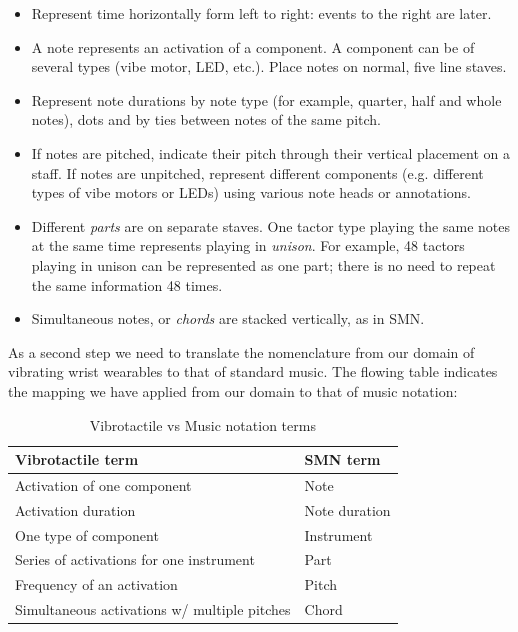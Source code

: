 \documentclass[a4paper, twocolumn]{article}
\begin{document}
\begin{itemize}
\item Represent time horizontally form left to right: events to the right are later.
\item A note represents an activation of a component. A component can be of several types (vibe motor, LED, etc.). Place notes on normal, five line staves.
\item Represent note durations by note type (for example, quarter, half and whole notes), dots and by ties between notes of the same pitch.
\item If notes are pitched, indicate their pitch through their vertical placement on a staff. If notes are unpitched, represent different components (e.g. different types of vibe motors or LEDs) using various note heads or annotations.
\item Different \textit{parts} are on separate staves. One tactor type playing the same notes at the same time represents playing in \textit{unison}. For example, 48 tactors playing in unison can be represented as one part; there is no need to repeat the same information 48 times. 
\item Simultaneous notes, or \textit{chords} are stacked vertically, as in SMN.
\end{itemize}

As a second step we need to translate the nomenclature from our domain of vibrating wrist wearables to that of standard music. The flowing table indicates the mapping we have applied from our domain to that of music notation:

\begin{table}[htbp]
\caption{Vibrotactile vs Music notation terms}
\small
\centering
\begin{tabular}{@{}ll@{}}
\toprule
Vibrotactile term & SMN term \\ 
\midrule
Activation of one component & Note \\
Activation duration & Note duration \\
One type of component & Instrument \\
Series of activations for one instrument & Part \\
Frequency of an activation & Pitch \\
Simultaneous activations w/ multiple pitches & Chord \\ 
\bottomrule
\end{tabular}
\end{table}
\end{document}
